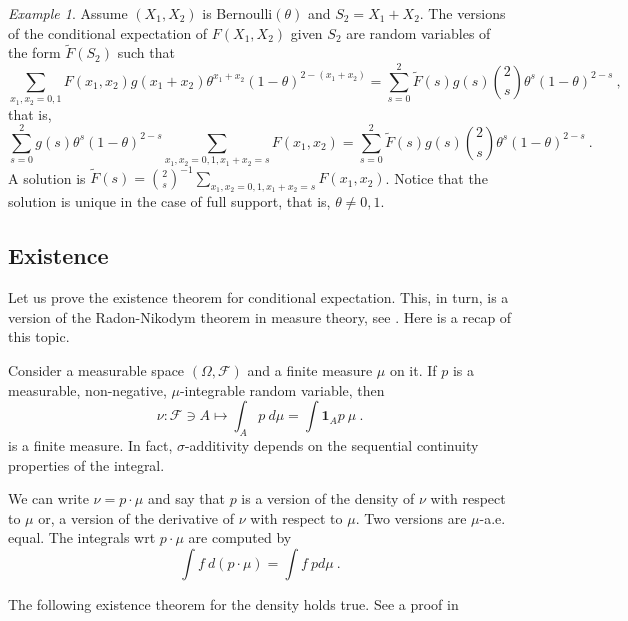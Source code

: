 \documentclass[12pt,a4paper]{amsart}
\newcommand{\one}{\bm 1}
\theoremstyle{plain}%
\theoremstyle{definition}
\theoremstyle{remark}
\newtheorem{example}{Example}
\begin{document}
\begin{example}
Assume $(X_1,X_2)$ is Bernoulli$(\theta)$ and $S_2=X_1+X_2$. The
versions of the conditional expectation of $F(X_1,X_2)$ given $S_2$
are random variables of the form $\widetilde F(S_2)$ such that
\begin{equation*}
  \sum_{x_1,x_2 = 0,1} F(x_1,x_2) g(x_1+x_2) \theta^{x_1+x_2}
  (1-\theta)^{2 - (x_1 + x_2)} = \sum_{s=0}^2 \widetilde F(s) g(s)
  \binom 2 s \theta^s (1-\theta)^{2-s} \ ,
\end{equation*}
that is,
\begin{equation*}
 \sum_{s=0}^2 g(s) \theta^{s}
  (1-\theta)^{2 - s} \sum_{x_1,x_2 = 0,1, x_1+x_2 = s} F(x_1,x_2)  = \sum_{s=0}^2 \widetilde F(s) g(s)
  \binom 2 s \theta^s (1-\theta)^{2-s} \ .
\end{equation*}
A solution is $\widetilde F(s) = \binom 2 s ^{-1} \sum_{x_1,x_2 = 0,1,
  x_1+x_2 = s} F(x_1,x_2)$. Notice that the solution is unique in the case of full support, that is, $\theta \neq 0,1$.  
\end{example}

\subsection{Existence}
\label{sec:exists}

Let us prove the existence theorem for conditional expectation. This,
in turn, is a version of the Radon-Nikodym theorem in measure theory,
see \cite[Ch.~6]{rudin:1987-3rd}. Here is a recap of this topic.

Consider a measurable space $(\Omega,\mathcal F)$ and a finite measure
$\mu$ on it. If $p$ is a measurable, non-negative, $\mu$-integrable
random variable, then
\begin{equation*}
  \nu \colon \mathcal F \ni A \mapsto \int_A p \ d\mu = \int \one_Ap \
  \mu \ .
\end{equation*}
is a finite measure. In fact, $\sigma$-additivity depends on the
sequential continuity properties of the integral.

We can write $\nu = p \cdot \mu$ and say that $p$ is a version of the
density of $\nu$ with respect to $\mu$ or, a version of the derivative
of $\nu$ with respect to $\mu$. Two versions are $\mu$-a.e. equal. The
integrals wrt $p \cdot \mu$ are computed by
\begin{equation*}
  \int f \ d(p \cdot \mu) = \int f \ pd\mu \ .
\end{equation*}

The following existence theorem for the density holds true. See a proof in \cite{rudin:1987-3rd}
\end{document}
